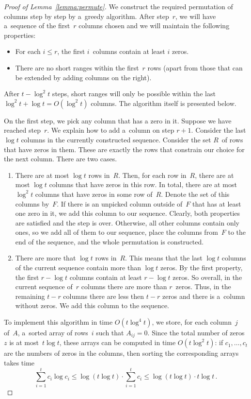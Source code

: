\begin{proof}[Proof of Lemma~\ref{lemma:permute}]
We construct the required permutation of columns step by step by a~greedy
algorithm. After step~$r$, we will have a~sequence of the first~$r$ columns
chosen and we will maintain the following properties:
\begin{itemize}
\item For each $i \leq r$, the first $i$~columns contain at least $i$ zeros.
\item There are no short ranges within the first~$r$ rows (apart from those
that can be extended by adding columns on the right).
\end{itemize}

After $t - \log^2 t$ steps, short ranges will only be possible within the last
$\log^2 t + \log t = O(\log^2 t)$ columns. The algorithm itself is presented
below.

On the first step, we pick any column that has a zero in it. Suppose
we have reached step~$r$. We explain how to add a~column on
step $r+1$. Consider the last $\log t$ columns in the currently
constructed sequence. Consider the set $R$~of rows that have
zeros in them. These are exactly the rows that constrain our
choice for the next column. There are two cases.
\begin{enumerate}
\item There are at most $\log t$ rows in~$R$. Then, for each row in~$R$, there
are at most $\log t$ columns that have zeros in this row. In total, there are at
most $\log^2 t$ columns that have zeros in some row of~$R$. Denote the set of
this columns by~$F$. If there is an unpicked column outside of~$F$ that has at
least one zero in it, we add this column to our sequence. Clearly, both
properties are satisfied and the step is over. Otherwise, all other columns
contain only ones, so we add all of them to our sequence, place the columns
from~$F$ to the end of the sequence, and the whole permutation is constructed.
\item There are more that $\log t$ rows in~$R$. This means that the last
$\log t$ columns of the current sequence contain more than $\log t$ zeros. By
the first property, the first $r - \log t$ columns contain at least $r - \log t$
zeros. So overall, in the current sequence of~$r$ columns there are more than
$r$~zeros. Thus, in the remaining $t-r$ columns there are less then $t-r$ zeros
and there is a~column without zeros. We add this column to the sequence.
\end{enumerate}


To implement this algorithm in time $O(t\log^{4}t)$, we store, for each
column~$j$ of~$A$, a~sorted array of rows~$i$ such that $A_{ij}=0$. Since the
total number of zeros~$z$ is at most~$t\log t$, these arrays can be computed in
time $O(t\log^2t)$: if $c_1, \dotsc, c_t$ are the numbers of zeros in the
columns, then sorting the corresponding arrays takes time
\[\sum_{i=1}^{t}c_i \log c_i \le \log(t \log t) \cdot \sum_{i=1}^{t}c_i \le \log(t \log t) \cdot t\log t \, .\]


\end{proof}

